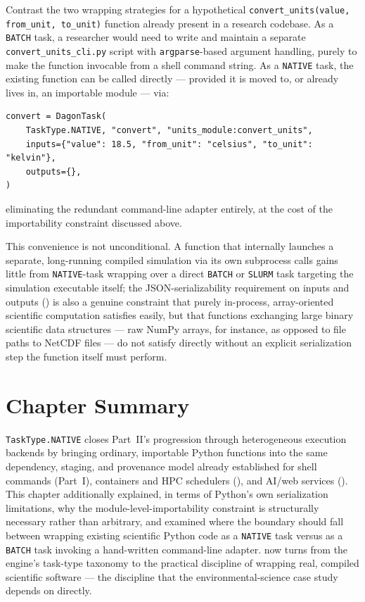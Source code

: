 \begin{example}
Contrast the two wrapping strategies for a hypothetical
\texttt{convert\_units(value, from\_unit, to\_unit)} function already
present in a research codebase. As a \texttt{BATCH} task, a researcher would
need to write and maintain a separate \texttt{convert\_units\_cli.py}
script with \texttt{argparse}-based argument handling, purely to make the
function invocable from a shell command string. As a \texttt{NATIVE} task,
the existing function can be called directly --- provided it is moved to,
or already lives in, an importable module --- via:
\begin{lstlisting}
convert = DagonTask(
    TaskType.NATIVE, "convert", "units_module:convert_units",
    inputs={"value": 18.5, "from_unit": "celsius", "to_unit": "kelvin"},
    outputs={},
)
\end{lstlisting}
eliminating the redundant command-line adapter entirely, at the cost of the
importability constraint discussed above.
\end{example}

\begin{cautionbox}
This convenience is not unconditional. A function that internally launches
a separate, long-running compiled simulation via its own subprocess calls
gains little from \texttt{NATIVE}-task wrapping over a direct
\texttt{BATCH} or \texttt{SLURM} task targeting the simulation executable
itself; the JSON-serializability requirement on inputs and outputs
() is also a genuine constraint that purely in-process,
array-oriented scientific computation satisfies easily, but that functions
exchanging large binary scientific data structures --- raw NumPy arrays, for
instance, as opposed to file paths to NetCDF files --- do not satisfy
directly without an explicit serialization step the function itself must
perform.
\end{cautionbox}

\section{Chapter Summary}

\texttt{TaskType.NATIVE} closes Part~II's progression through heterogeneous
execution backends by bringing ordinary, importable Python functions into
the same dependency, staging, and provenance model already established for
shell commands (Part~I), containers and HPC schedulers
(), and AI/web services ().
This chapter additionally explained, in terms of Python's own serialization
limitations, why the module-level-importability constraint is structurally
necessary rather than arbitrary, and examined where the boundary should fall
between wrapping existing scientific Python code as a \texttt{NATIVE} task
versus as a \texttt{BATCH} task invoking a hand-written command-line
adapter.  now turns from the engine's task-type
taxonomy to the practical discipline of wrapping real, compiled scientific
software --- the discipline that the environmental-science case study
depends on directly.

